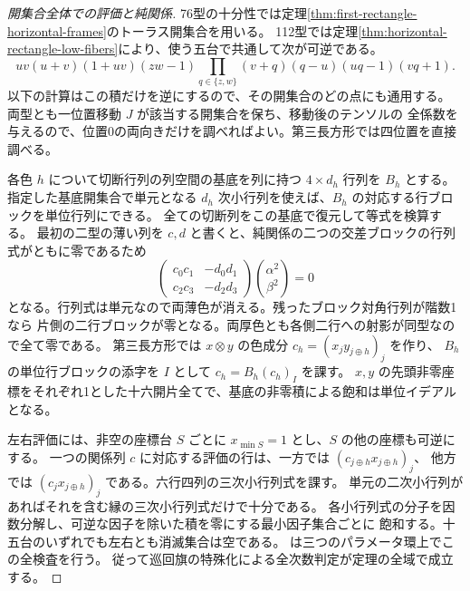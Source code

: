 \begin{proof}[開集合全体での評価と純関係]
76型の十分性では定理\ref{thm:first-rectangle-horizontal-frames}のトーラス開集合を用いる。
112型では定理\ref{thm:horizontal-rectangle-low-fibers}により、使う五台で共通して次が可逆である。
\[
 uv(u+v)(1+uv)(zw-1)
 \prod_{q\in\{z,w\}}(v+q)(q-u)(uq-1)(vq+1).
\]
以下の計算はこの積だけを逆にするので、その開集合のどの点にも通用する。
両型とも一位置移動 $J$ が該当する開集合を保ち、移動後のテンソルの
全係数を与えるので、位置0の両向きだけを調べればよい。第三長方形では四位置を直接調べる。

各色 $h$ について切断行列の列空間の基底を列に持つ $4\times d_h$ 行列を $B_h$ とする。
指定した基底開集合で単元となる $d_h$ 次小行列を使えば、$B_h$ の対応する行ブロックを単位行列にできる。
全ての切断列をこの基底で復元して等式を検算する。
最初の二型の薄い列を $c,d$ と書くと、純関係の二つの交差ブロックの行列式がともに零であるため
\[
 \begin{pmatrix}c_0c_1&-d_0d_1\\c_2c_3&-d_2d_3\end{pmatrix}
 \binom{\alpha^2}{\beta^2}=0
\]
となる。行列式は単元なので両薄色が消える。残ったブロック対角行列が階数1なら
片側の二行ブロックが零となる。両厚色とも各側二行への射影が同型なので全て零である。
第三長方形では $x\otimes y$ の色成分 $c_h=(x_j y_{j\oplus h})_j$ を作り、
$B_h$ の単位行ブロックの添字を $I$ として $c_h=B_h(c_h)_I$ を課す。
$x,y$ の先頭非零座標をそれぞれ1とした十六開片全てで、基底の非零積による飽和は単位イデアルとなる。

左右評価には、非空の座標台 $S$ ごとに $x_{\min S}=1$ とし、$S$ の他の座標も可逆にする。
一つの関係列 $c$ に対応する評価の行は、一方では $(c_{j\oplus h} x_{j\oplus h})_j$、
他方では $(c_j x_{j\oplus h})_j$ である。六行四列の三次小行列式を課す。
単元の二次小行列があればそれを含む縁の三次小行列式だけで十分である。
各小行列式の分子を因数分解し、可逆な因子を除いた積を零にする最小因子集合ごとに
飽和する。十五台のいずれでも左右とも消滅集合は空である。
 は三つのパラメータ環上でこの全検査を行う。
従って巡回旗の特殊化による全次数判定が定理の全域で成立する。
\end{proof}
